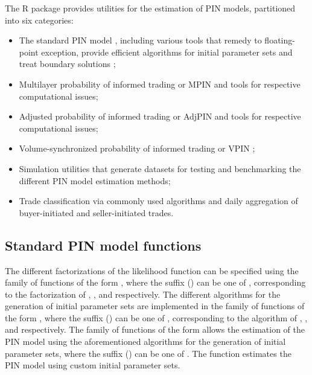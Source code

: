 The R package  provides utilities for the estimation of PIN models, partitioned into six categories: 

\begin{itemize}
\item The standard PIN model \citep{easley1992time,easley1996liquidity}, including various tools that remedy to floating-point exception, provide efficient algorithms for initial parameter sets and treat boundary solutions \citep{Lin2011computing,Yan2012improved,Gan2015faster,Ersan2016unbiased, ke2019note};

\item Multilayer probability of informed trading or MPIN \citep{ersan2016multilayer} and tools for respective computational issues; 

\item Adjusted probability of informed trading or AdjPIN \citep{duarte2009why} and tools for respective computational issues;

\item Volume-synchronized probability of informed trading or VPIN \citep{Easley2011microstructure,Easley2012Flow};

\item Simulation utilities that generate datasets for testing and benchmarking the different PIN model estimation methods;

\item Trade classification via commonly used algorithms and daily aggregation of buyer-initiated and seller-initiated trades.
\end{itemize}



\subsection{Standard PIN model functions}

The different factorizations of the likelihood function can be specified using the family of functions of the form , where the suffix (\code{*}) can be one of , corresponding to the factorization of \cite{Easley2010Factoring}, \cite{Lin2011computing}, and \cite{ersan2016multilayer} respectively. The different algorithms for the generation of initial parameter sets are implemented in the family of functions of the form , where the suffix (\code{*}) can be one of , corresponding to the algorithm of \cite{Yan2012improved}, \cite{Gan2015faster}, and \cite{Ersan2016unbiased} respectively. The family of functions of the form  allows the estimation of the PIN model using the aforementioned algorithms for the generation of initial parameter sets, where the suffix (\code{*}) can be one of . The function  estimates the PIN model using custom initial parameter sets. 

